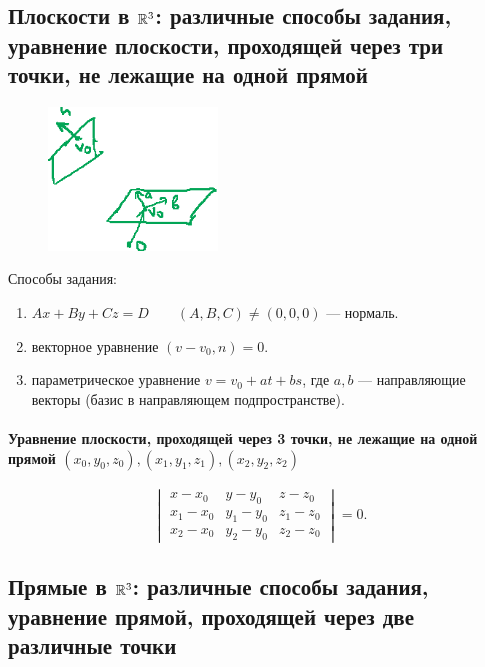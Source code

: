 \subsection{Плоскости в $\mathbb{R}^3$: различные способы задания, уравнение плоскости, проходящей через три точки, не лежащие на одной прямой}

\begin{figure}
    \includegraphics[width=4.5cm]{img/lecture26_drawing_2}
    \vspace{-30pt}
\end{figure}

Способы задания:

\begin{enumerate}
    \item $Ax + By + Cz = D \quad\quad(A, B, C) \neq (0, 0, 0)$ --- нормаль.
    \item векторное уравнение $(v - v_0, n) = 0$.
    \item параметрическое уравнение $v = v_0 + at + bs$, где $a, b$ --- направляющие векторы (базис в направляющем подпространстве).
\end{enumerate}

\paragraph{Уравнение плоскости, проходящей через 3 точки, не лежащие на одной прямой $(x_0, y_0, z_0), (x_1, y_1, z_1), (x_2, y_2, z_2)$}

\begin{equation*}
    \begin{vmatrix} 
        x - x_0 & y - y_0 & z - z_0 \\
        x_1 - x_0 & y_1 - y_0 & z_1 - z_0 \\
        x_2 - x_0 & y_2 - y_0 & z_2 - z_0
    \end{vmatrix} = 0
.\end{equation*}


\subsection{Прямые в $\mathbb{R}^3$: различные способы задания, уравнение прямой, проходящей через две различные точки}

